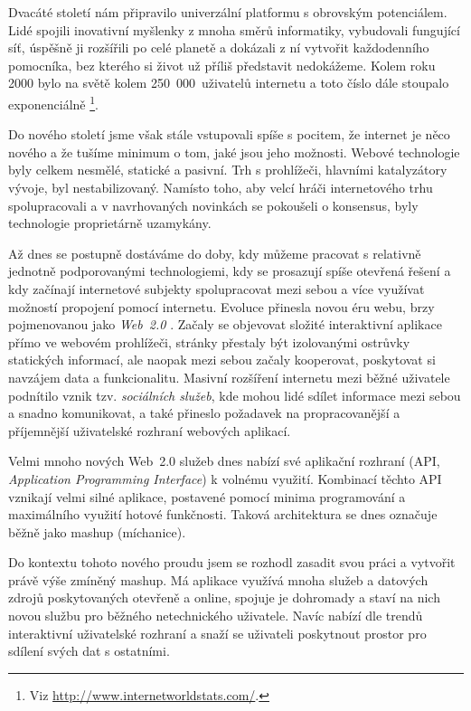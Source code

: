 Dvacáté století nám připravilo univerzální platformu s obrovským
potenciálem. Lidé spojili inovativní myšlenky z mnoha směrů informatiky,
vybudovali fungující síť, úspěšně ji rozšířili po celé planetě
a dokázali z ní vytvořit každodenního pomocníka, bez kterého si život
už příliš představit nedokážeme. Kolem roku 2000 bylo na světě kolem
250~000~uživatelů internetu a toto číslo dále stoupalo exponenciálně
\footnote{Viz \url{http://www.internetworldstats.com/}.}.

Do nového století jsme však stále vstupovali spíše s pocitem, že
internet je něco nového a že tušíme minimum o tom, jaké jsou jeho
možnosti. Webové technologie byly celkem nesmělé, statické a pasivní.
Trh s prohlížeči, hlavními katalyzátory vývoje, byl nestabilizovaný.
Namísto toho, aby velcí hráči internetového trhu spolupracovali a v
navrhovaných novinkách se pokoušeli o konsensus, byly technologie
proprietárně uzamykány.

Až dnes se postupně dostáváme do doby, kdy můžeme pracovat s
relativně jednotně podporovanými technologiemi, kdy se prosazují
spíše otevřená řešení a kdy začínají internetové subjekty
spolupracovat mezi sebou a více využívat možností propojení pomocí
internetu. Evoluce přinesla novou éru webu, brzy pojmenovanou jako
{\it Web~2.0} \cite{web20}. Začaly se objevovat složité interaktivní
aplikace přímo ve webovém prohlížeči, stránky přestaly být izolovanými ostrůvky
statických informací, ale naopak mezi sebou začaly kooperovat,
poskytovat si navzájem data a funkcionalitu. Masivní rozšíření
internetu mezi běžné uživatele podnítilo vznik tzv. {\it sociálních
služeb}, kde mohou lidé sdílet informace mezi sebou a snadno
komunikovat, a také přineslo požadavek na propracovanější a
příjemnější uživatelské rozhraní webových aplikací.

Velmi mnoho nových Web~2.0 služeb dnes nabízí své aplikační
rozhraní (API, {\it Application Programming Interface}) k volnému
využití. Kombinací těchto API vznikají velmi silné aplikace, postavené
pomocí minima programování a maximálního využití hotové funkčnosti.
Taková architektura se dnes označuje běžně jako mashup (míchanice).

Do kontextu tohoto nového proudu jsem se rozhodl zasadit svou práci a
vytvořit právě výše zmíněný mashup. Má aplikace využívá mnoha služeb a
datových zdrojů poskytovaných otevřeně a online, spojuje je dohromady
a staví na nich novou službu pro běžného netechnického uživatele.
Navíc nabízí dle trendů interaktivní uživatelské rozhraní a snaží se
uživateli poskytnout prostor pro sdílení svých dat s ostatními.

